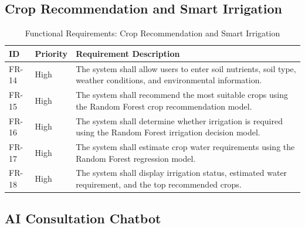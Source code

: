 \subsection{Crop Recommendation and Smart Irrigation}
\label{subsec:fr_crop_irrigation}

\begin{table}[H]
\centering
\caption{Functional Requirements: Crop Recommendation and Smart Irrigation}
\label{tab:fr_crop}
\renewcommand{\arraystretch}{1.4}
\begin{tabularx}{\textwidth}{l l X}
\toprule
\textbf{ID} & \textbf{Priority} & \textbf{Requirement Description} \\
\midrule
FR-14 & High & The system shall allow users to enter soil nutrients, soil type, weather conditions, and environmental information.\\
FR-15 & High & The system shall recommend the most suitable crops using the Random Forest crop recommendation model.\\
FR-16 & High & The system shall determine whether irrigation is required using the Random Forest irrigation decision model.\\
FR-17 & High & The system shall estimate crop water requirements using the Random Forest regression model.\\
FR-18 & High & The system shall display irrigation status, estimated water requirement, and the top recommended crops.\\
\bottomrule
\end{tabularx}
\end{table}

\subsection{AI Consultation Chatbot}
\label{subsec:fr_chatbot}

